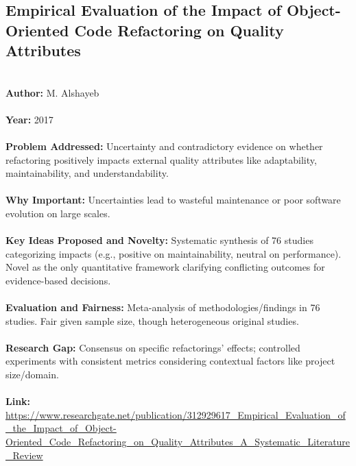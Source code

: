 \documentclass[12pt]{article}
\begin{document}
\subsection*{Empirical Evaluation of the Impact of Object-Oriented Code Refactoring on Quality Attributes}
\\
\textbf{Author:} M. Alshayeb \\
\\
\textbf{Year:} 2017 \\
\\
\textbf{Problem Addressed:} Uncertainty and contradictory evidence on whether refactoring positively impacts external quality attributes like adaptability, maintainability, and understandability. \\
\\
\textbf{Why Important:} Uncertainties lead to wasteful maintenance or poor software evolution on large scales. \\
\\
\textbf{Key Ideas Proposed and Novelty:} Systematic synthesis of 76 studies categorizing impacts (e.g., positive on maintainability, neutral on performance). Novel as the only quantitative framework clarifying conflicting outcomes for evidence-based decisions. \\
\\
\textbf{Evaluation and Fairness:} Meta-analysis of methodologies/findings in 76 studies. Fair given sample size, though heterogeneous original studies. \\
\\
\textbf{Research Gap:} Consensus on specific refactorings’ effects; controlled experiments with consistent metrics considering contextual factors like project size/domain. \\
\\
\textbf{Link:} \url{https://www.researchgate.net/publication/312929617_Empirical_Evaluation_of_the_Impact_of_Object-Oriented_Code_Refactoring_on_Quality_Attributes_A_Systematic_Literature_Review}
\pagebreak

\end{document}
